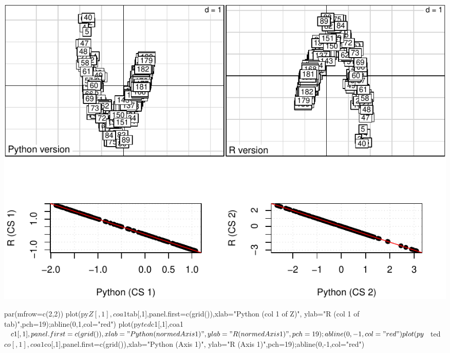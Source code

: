\documentclass[
  10pt,
]{article}
\newenvironment{Shaded}{\begin{snugshade}}{\end{snugshade}}
\newcommand{\NormalTok}[1]{#1}
\begin{document}
\begin{Shaded}
\end{Shaded}

\includegraphics{RandPytonAnalysisPDF_files/figure-latex/unnamed-chunk-28-1.pdf}

\begin{Shaded}
\begin{Highlighting}[]
\NormalTok{par(mfrow=c(2,2))}
\NormalTok{plot(py$Z[,1],coa1$tab[,1],panel.first=c(grid()),xlab="Python (col 1 of Z)",}
\NormalTok{     ylab="R (col 1 of tab)",pch=19);abline(0,1,col="red")}
\NormalTok{plot(py$ted$c1[,1],coa1$c1[,1],panel.first=c(grid()),xlab="Python (normed Axis 1)",}
\NormalTok{     ylab="R (normed Axis 1)",pch=19);abline(0,{-}1,col="red")}
\NormalTok{plot(py$ted$co[,1],coa1$co[,1],panel.first=c(grid()),xlab="Python (Axis 1)",}
\NormalTok{     ylab="R (Axis 1)",pch=19);abline(0,{-}1,col="red")}
\end{Highlighting}
\end{Shaded}
\end{document}
